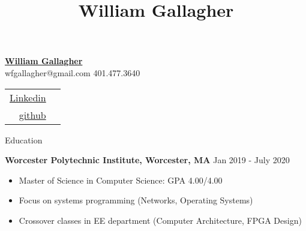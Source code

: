 \documentclass[10pt,a4paper]{article}
\title{William Gallagher}
\begin{document}
{\selectfont

\begin{tcolorbox}
  \begin{minipage}{.5\textwidth}
    \underline{\huge{\textbf{William Gallagher}}}\\
    \normalsize{wfgallagher@gmail.com}
    \textbar
    \normalsize{ 401.477.3640}
  \end{minipage}
  \begin{minipage}{.5\textwidth}
      \begin{center}
        \begin{flushright}
          {\textcolor{black}
            {
              {\selectfont
                \begin{tabular} {r l}
                  \href{https://www.linkedin.com/in/william-gallagher-705199170}{Linkedin} \\
                  \href{https://github.com/william-gallagher/}{github} \\
                \end{tabular}
              }
            }
          }
        \end{flushright}
      \end{center}
  \end{minipage}
\end{tcolorbox}

\begin{tcolorbox}

  {\selectfont
    \begin{center}
      \LARGE{Education}
    \end{center}
  }

  \tcblower

      \large{\textbf{Worcester Polytechnic Institute, Worcester, MA }}
      \hfill
      \large{Jan 2019 - July 2020}
      \begin{itemize}[noitemsep]
        \item Master of Science in Computer Science: GPA 4.00/4.00
        \item Focus on systems programming (Networks, Operating Systems)
        \item Crossover classes in EE department (Computer Architecture, FPGA Design)

      \end{itemize}


\end{tcolorbox}}
\end{document}
